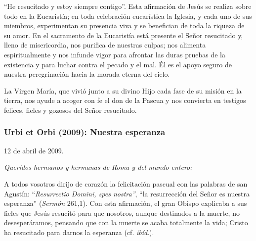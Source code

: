 			\begin{body}“He resucitado y estoy siempre contigo”. Esta afirmación de Jesús se realiza sobre todo en la Eucaristía; en toda celebración eucarística la Iglesia, y cada uno de sus miembros, experimentan su presencia viva y se benefician de toda la riqueza de su amor. En el sacramento de la Eucaristía está presente el Señor resucitado y, lleno de misericordia, nos purifica de nuestras culpas; nos alimenta espiritualmente y nos infunde vigor para afrontar las duras pruebas de la existencia y para luchar contra el pecado y el mal. Él es el apoyo seguro de nuestra peregrinación hacia la morada eterna del cielo. \end{body}
			
			\begin{body}La Virgen María, que vivió junto a su divino Hijo cada fase de su misión en la tierra, nos ayude a acoger con fe el don de la Pascua y nos convierta en testigos felices, fieles y gozosos del Señor resucitado.\end{body}
			
			\subsubsection{Urbi et Orbi (2009): Nuestra esperanza}
			
			\begin{referencia}12 de abril de 2009. \end{referencia}
			
			\begin{body}\textit{Queridos hermanos y hermanas de Roma y del mundo entero: }\end{body}
			
			\begin{body}A todos vosotros dirijo de corazón la felicitación pascual con las palabras de san Agustín: “\textit{Resurrectio Domini, spes nostra”}, “la resurrección del Señor es nuestra esperanza” (\textit{Sermón} 261,1). Con esta afirmación, el gran Obispo explicaba a sus fieles que Jesús resucitó para que nosotros, aunque destinados a la muerte, no desesperáramos, pensando que con la muerte se acaba totalmente la vida; Cristo ha resucitado para darnos la esperanza (cf. \textit{ibíd}.). \end{body}
			
